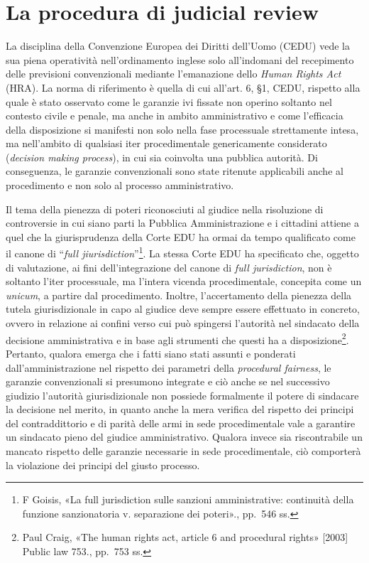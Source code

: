 \documentclass[12pt,it,a4paper,]{report}
\begin{document}
\hypertarget{la-procedura-di-judicial-review}{%
\section{La procedura di judicial
review}\label{la-procedura-di-judicial-review}}

La disciplina della Convenzione Europea dei Diritti dell'Uomo (CEDU)
vede la sua piena operatività nell'ordinamento inglese solo all'indomani
del recepimento delle previsioni convenzionali mediante l'emanazione
dello \emph{Human Rights Act} (HRA). La norma di riferimento è quella di
cui all'art. 6, §1, CEDU, rispetto alla quale è stato osservato come le
garanzie ivi fissate non operino soltanto nel contesto civile e penale,
ma anche in ambito amministrativo e come l'efficacia della disposizione
si manifesti non solo nella fase processuale strettamente intesa, ma
nell'ambito di qualsiasi iter procedimentale genericamente considerato
(\emph{decision making process}), in cui sia coinvolta una pubblica
autorità. Di conseguenza, le garanzie convenzionali sono state ritenute
applicabili anche al procedimento e non solo al processo amministrativo.

Il tema della pienezza di poteri riconosciuti al giudice nella
risoluzione di controversie in cui siano parti la Pubblica
Amministrazione e i cittadini attiene a quel che la giurisprudenza della
Corte EDU ha ormai da tempo qualificato come il canone di ``\emph{full
jiurisdiction}''\footnote{{F Goisis, {«La full jurisdiction sulle
  sanzioni amministrative: continuità della funzione sanzionatoria v.
  separazione dei poteri»}.}, pp.~546 ss.}. La stessa Corte EDU ha
specificato che, oggetto di valutazione, ai fini dell'integrazione del
canone di \emph{full jurisdiction}, non è soltanto l'iter processuale,
ma l'intera vicenda procedimentale, concepita come un \emph{unicum}, a
partire dal procedimento. Inoltre, l'accertamento della pienezza della
tutela giurisdizionale in capo al giudice deve sempre essere effettuato
in concreto, ovvero in relazione ai confini verso cui può spingersi
l'autorità nel sindacato della decisione amministrativa e in base agli
strumenti che questi ha a disposizione\footnote{{Paul Craig, {«The human
  rights act, article 6 and procedural rights»} {[}2003{]} Public law
  753.}, pp.~753 ss.}. Pertanto, qualora emerga che i fatti siano stati
assunti e ponderati dall'amministrazione nel rispetto dei parametri
della \emph{procedural fairness}, le garanzie convenzionali si presumono
integrate e ciò anche se nel successivo giudizio l'autorità
giurisdizionale non possiede formalmente il potere di sindacare la
decisione nel merito, in quanto anche la mera verifica del rispetto dei
principi del contraddittorio e di parità delle armi in sede
procedimentale vale a garantire un sindacato pieno del giudice
amministrativo. Qualora invece sia riscontrabile un mancato rispetto
delle garanzie necessarie in sede procedimentale, ciò comporterà la
violazione dei principi del giusto processo.
\end{document}
